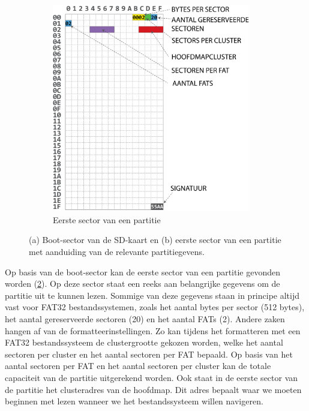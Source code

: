 \begin{figure}[h!]
\begin{subfigure}[t]{0.7\textwidth}
        \includegraphics[width=0.95\textwidth]{img/volume-id.png}
        \caption{Eerste sector van een partitie}
        \label{fig:volume-id}
    \end{subfigure}
    \caption{(a) Boot-sector van de SD-kaart en (b) eerste sector van een partitie met aanduiding van de relevante partitiegevens.}
\end{figure}

Op basis van de boot-sector kan de eerste sector van een partitie gevonden worden (\cref{fig:volume-id}). Op deze sector staat een reeks aan belangrijke gegevens om de partitie uit te kunnen lezen. Sommige van deze gegevens staan in principe altijd vast voor FAT32 bestandssystemen, zoals het aantal bytes per sector (512 bytes), het aantal gereserveerde sectoren (20) en het aantal FATs (2). Andere zaken hangen af van de formatteerinstellingen. Zo kan tijdens het formatteren met een FAT32 bestandssysteem de clustergrootte gekozen worden, welke het aantal sectoren per cluster en het aantal sectoren per FAT bepaald. Op basis van het aantal sectoren per FAT en het aantal sectoren per cluster kan de totale capaciteit van de partitie uitgerekend worden. Ook staat in de eerste sector van de partitie het clusteradres van de hoofdmap. Dit adres bepaalt waar we moeten beginnen met lezen wanneer we het bestandssysteem willen navigeren.

